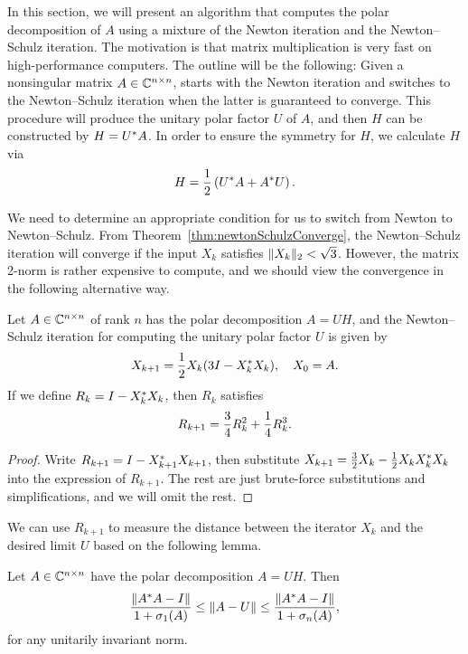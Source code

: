 \documentclass[12pt]{article}
\begin{document}
In this section, we will present an algorithm that computes the polar decomposition of $A$ using a mixture of the Newton iteration and the Newton--Schulz iteration. The motivation is that matrix multiplication is very fast on high-performance computers. The outline will be the following: Given a nonsingular matrix $A\in\mathbb{C}^{n\times n}$, starts with the Newton iteration and switches to the Newton--Schulz iteration when the latter is guaranteed to converge. This procedure will produce the unitary polar factor $U$ of $A$, and then $H$ can be constructed by $H = U^* A$. In order to ensure the symmetry for $H$, we calculate $H$ via
\begin{equation}
    \notag 
    H = \frac{1}{2}\left(U^* A + A^* U\right).
\end{equation}

We need to determine an appropriate condition for us to switch from Newton to Newton--Schulz. From Theorem~\ref{thm:newtonSchulzConverge}, the Newton--Schulz iteration will converge if the input $X_k$ satisfies $\|{X_k}\|_2 < \sqrt{3}$. However, the matrix 2-norm is rather expensive to compute, and we should view the convergence in the following alternative way.

\begin{theorem}
    \label{thm:Conv-in-R}
    Let $A\in\mathbb{C}^{n\times n}$ of rank $n$ has the polar decomposition $A=UH$, and the Newton--Schulz iteration for computing the unitary polar factor $U$ is given by
    \begin{equation}
        \notag 
        X_{k+1} = \frac{1}{2}X_k(3I - X_k^* X_k), \quad X_0 = A.
    \end{equation}
    If we define $R_k = I - X_k^* X_k$, then $R_k$ satisfies
    \begin{equation}
        \notag
        R_{k+1} = \frac{3}{4}R_k^2 + \frac{1}{4}R_k^3.
    \end{equation}
\end{theorem}

\begin{proof}
    Write $R_{k+1} = I - X_{k+1}^* X_{k+1}$, then substitute $X_{k+1} = \frac{3}{2} X_k - \frac{1}{2}X_kX_k^* X_k$ into the expression of $R_{k+1}$. The rest are just brute-force substitutions and simplifications, and we will omit the rest.
\end{proof}

We can use $R_{k+1}$ to measure the distance between the iterator $X_k$ and the desired limit $U$ based on the following lemma.

\begin{lemma}
    Let $A\in\mathbb{C}^{n\times n}$ have the polar decomposition $A=UH$. Then 
    \begin{equation}
        \label{eq:DistEquiv} 
        \frac{\|{A^* A - I}\|}{1+\sigma_1(A)} \leq \|{A-U}\| \leq 
        \frac{\|{A^* A - I}\|}{1+\sigma_n(A)},
    \end{equation}
    for any unitarily invariant norm.
\end{lemma}
\end{document}
